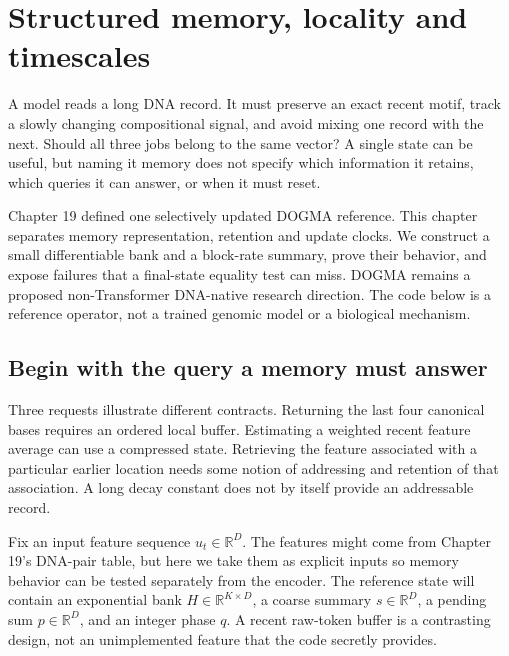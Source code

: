 \chapter{Structured memory, locality and timescales}

A model reads a long DNA record. It must preserve an exact recent motif,
track a slowly changing compositional signal, and avoid mixing one record
with the next. Should all three jobs belong to the same vector? A single
state can be useful, but naming it memory does not specify which
information it retains, which queries it can answer, or when it must reset.

Chapter 19 defined one selectively updated DOGMA reference. This chapter
separates memory representation, retention and update clocks. We construct
a small differentiable bank and a block-rate summary, prove their behavior,
and expose failures that a final-state equality test can miss. DOGMA remains
a proposed non-Transformer DNA-native research direction. The code below is
a reference operator, not a trained genomic model or a biological mechanism.

\section{Begin with the query a memory must answer}

Three requests illustrate different contracts. Returning the last four
canonical bases requires an ordered local buffer. Estimating a weighted
recent feature average can use a compressed state. Retrieving the feature
associated with a particular earlier location needs some notion of
addressing and retention of that association. A long decay constant does
not by itself provide an addressable record.

Fix an input feature sequence $u_t\in\mathbb R^D$. The features might come
from Chapter 19's DNA-pair table, but here we take them as explicit inputs
so memory behavior can be tested separately from the encoder. The reference
state will contain an exponential bank $H\in\mathbb R^{K\times D}$, a coarse
summary $s\in\mathbb R^D$, a pending sum $p\in\mathbb R^D$, and an integer
phase $q$. A recent raw-token buffer is a contrasting design, not an
unimplemented feature that the code secretly provides.


